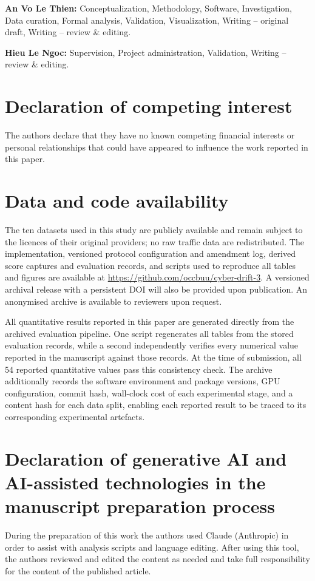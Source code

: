 \documentclass[a4paper,fleqn]{cas-dc}
\begin{document}
\textbf{An Vo Le Thien:} Conceptualization, Methodology, Software, Investigation, Data curation, Formal analysis, Validation, Visualization, Writing -- original draft, Writing -- review \& editing.

\textbf{Hieu Le Ngoc:} Supervision, Project administration, Validation, Writing -- review \& editing.

\section*{Declaration of competing interest}
The authors declare that they have no known competing financial interests or personal relationships that could have appeared to influence the work reported in this paper.

\section*{Data and code availability}


The ten datasets used in this study are publicly available and remain subject to the licences of their original providers; no raw traffic data are redistributed. The implementation, versioned protocol configuration and amendment log, derived score captures and evaluation records, and scripts used to reproduce all tables and figures are available at \url{https://github.com/occbuu/cyber-drift-3}. A versioned archival release with a persistent DOI will also be provided upon publication. An anonymised archive is available to reviewers upon request.

All quantitative results reported in this paper are generated directly from the archived evaluation pipeline. One script regenerates all tables from the stored evaluation records, while a second independently verifies every numerical value reported in the manuscript against those records. At the time of submission, all 54 reported quantitative values pass this consistency check. The archive additionally records the software environment and package versions, GPU configuration, commit hash, wall-clock cost of each experimental stage, and a content hash for each data split, enabling each reported result to be traced to its corresponding experimental artefacts.

\section*{Declaration of generative AI and AI-assisted technologies in the manuscript preparation process}
During the preparation of this work the authors used Claude (Anthropic) in order to assist with analysis scripts and language editing. After using this tool, the authors reviewed and edited the content as needed and take full responsibility for the content of the published article.



\end{document}
